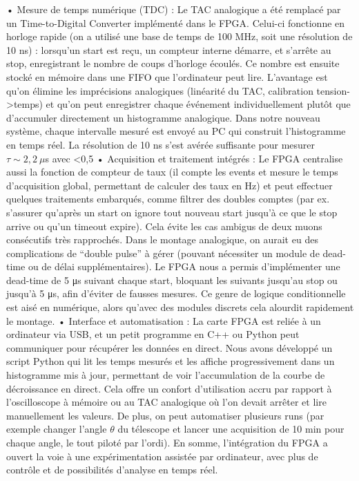 \documentclass[a4paper,12pt,twoside]{article}
\begin{document}
	•	Mesure de temps numérique (TDC) : Le TAC analogique a été remplacé par un Time-to-Digital Converter implémenté dans le FPGA. Celui-ci fonctionne en horloge rapide (on a utilisé une base de temps de 100 MHz, soit une résolution de 10 ns) : lorsqu’un start est reçu, un compteur interne démarre, et s’arrête au stop, enregistrant le nombre de coups d’horloge écoulés. Ce nombre est ensuite stocké en mémoire dans une FIFO que l’ordinateur peut lire. L’avantage est qu’on élimine les imprécisions analogiques (linéarité du TAC, calibration tension->temps) et qu’on peut enregistrer chaque événement individuellement plutôt que d’accumuler directement un histogramme analogique. Dans notre nouveau système, chaque intervalle mesuré est envoyé au PC qui construit l’histogramme en temps réel. La résolution de 10 ns s’est avérée suffisante pour mesurer $\tau \sim 2,2~\mu$s avec <0,5%
	•	Acquisition et traitement intégrés : Le FPGA centralise aussi la fonction de compteur de taux (il compte les events et mesure le temps d’acquisition global, permettant de calculer des taux en Hz) et peut effectuer quelques traitements embarqués, comme filtrer des doubles comptes (par ex. s’assurer qu’après un start on ignore tout nouveau start jusqu’à ce que le stop arrive ou qu’un timeout expire). Cela évite les cas ambigus de deux muons consécutifs très rapprochés. Dans le montage analogique, on aurait eu des complications de “double pulse” à gérer (pouvant nécessiter un module de dead-time ou de délai supplémentaires). Le FPGA nous a permis d’implémenter une dead-time de 5 μs suivant chaque start, bloquant les suivants jusqu’au stop ou jusqu’à 5 μs, afin d’éviter de fausses mesures. Ce genre de logique conditionnelle est aisé en numérique, alors qu’avec des modules discrets cela alourdit rapidement le montage.
	•	Interface et automatisation : La carte FPGA est reliée à un ordinateur via USB, et un petit programme en C++ ou Python peut communiquer pour récupérer les données en direct. Nous avons développé un script Python qui lit les temps mesurés et les affiche progressivement dans un histogramme mis à jour, permettant de voir l’accumulation de la courbe de décroissance en direct. Cela offre un confort d’utilisation accru par rapport à l’oscilloscope à mémoire ou au TAC analogique où l’on devait arrêter et lire manuellement les valeurs. De plus, on peut automatiser plusieurs runs (par exemple changer l’angle $\theta$ du télescope et lancer une acquisition de 10 min pour chaque angle, le tout piloté par l’ordi). En somme, l’intégration du FPGA a ouvert la voie à une expérimentation assistée par ordinateur, avec plus de contrôle et de possibilités d’analyse en temps réel.
\end{document}
